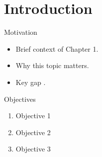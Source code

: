 \section{Introduction}

\begin{frame}{Motivation}
  \begin{itemize}
    \item Brief context of Chapter 1.
    \item Why this topic matters.
    \item Key gap .
  \end{itemize}
\end{frame}

\begin{frame}{Objectives}
  \begin{enumerate}
    \item Objective 1
    \item Objective 2
    \item Objective 3
  \end{enumerate}
\end{frame}
